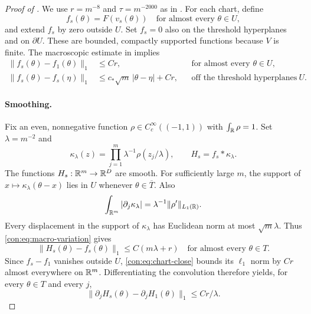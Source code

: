\begin{proof}[Proof of ]
We use $r=m^{-8}$ and $\tau=m^{-2000}$ as in .
For each chart, define
\[
  f_s(\theta)=F(v_s(\theta))\quad\text{for almost every }\theta\in U,
\]
and extend $f_s$ by zero outside $U$. Set $f_s=0$ also on the threshold hyperplanes and on $\partial U$.
These are bounded, compactly supported functions because $V$ is finite. The
macroscopic estimate in  implies
\begin{align}
  \|f_s(\theta)-f_1(\theta)\|_1&\le Cr,
       &&\text{for almost every }\theta\in U,\label{con:eq:chart-close}\\
  \|f_s(\theta)-f_s(\eta)\|_1
       &\le c_*\sqrt m\,|\theta-\eta|+Cr,
       &&\text{off the threshold hyperplanes in }U.
       \label{con:eq:macro-variation}
\end{align}

\paragraph{Smoothing.}
Fix an even, nonnegative function $\rho\in C_c^\infty((-1,1))$ with
$\int_\mathbb R\rho=1$. Set $\lambda=m^{-2}$ and
\[
  \kappa_\lambda(z)=\prod_{j=1}^m\lambda^{-1}\rho(z_j/\lambda),
  \qquad H_s=f_s*\kappa_\lambda.
\]
The functions $H_s:\mathbb R^m\to\mathbb R^D$ are smooth. For sufficiently large $m$,
the support of $x\mapsto\kappa_\lambda(\theta-x)$ lies in $U$ whenever
$\theta\in\overline T$. Also
\[
  \int_{\mathbb R^m}|\partial_j\kappa_\lambda|
       =\lambda^{-1}\|\rho'\|_{L_1(\mathbb R)}.
\]
Every displacement in the support of $\kappa_\lambda$ has Euclidean norm
at most $\sqrt m\lambda$. Thus \eqref{con:eq:macro-variation} gives
\begin{equation}
  \|H_s(\theta)-f_s(\theta)\|_1\le C(m\lambda+r)
  \quad\text{for almost every }\theta\in T.
  \label{con:eq:smoothing-error}
\end{equation}
Since $f_s-f_1$ vanishes outside $U$, \eqref{con:eq:chart-close} bounds its
$\ell_1$ norm by $Cr$ almost everywhere on $\mathbb R^m$. Differentiating the
convolution therefore yields, for every $\theta\in T$ and every $j$,
\begin{equation}
  \|\partial_jH_s(\theta)-\partial_jH_1(\theta)\|_1
      \le Cr/\lambda.
  \label{con:eq:derivative-mismatch}
\end{equation}


\end{proof}
